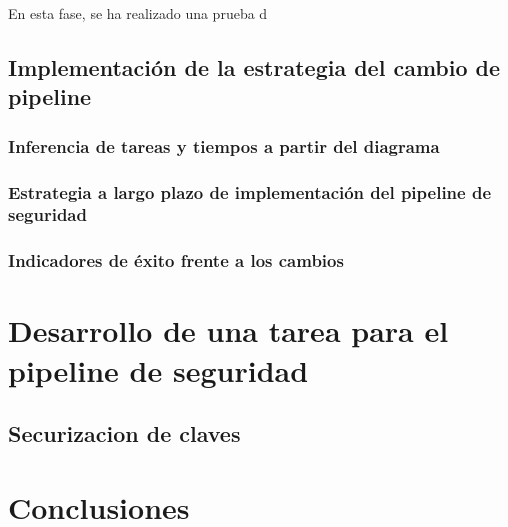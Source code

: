 \documentclass[12pt]{report} %
\begin{document}
En esta fase, se ha realizado una prueba d


\section{Implementación de la estrategia del cambio de pipeline}

\subsection{Inferencia de tareas y tiempos a partir del diagrama}

\subsection{Estrategia a largo plazo de implementación del pipeline de seguridad}

\subsection{Indicadores de éxito frente a los cambios}

\chapter{Desarrollo de una tarea para el pipeline de seguridad}

\section{Securizacion de claves}







\chapter{Conclusiones}
\end{document}
